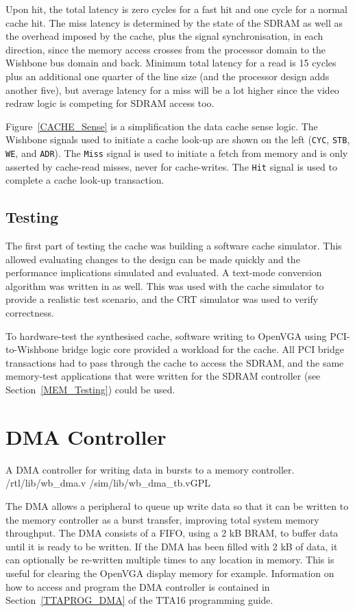 Upon hit, the total latency is zero cycles for a fast hit and one cycle for a
normal cache hit. The miss latency is determined by the state of the SDRAM as
well as the overhead imposed by the cache, plus the signal synchronisation, in
each direction, since the memory access crosses from the processor domain
to the Wishbone bus domain and back. Minimum total latency for a read is 15
cycles plus an additional one quarter of the line size (and the processor
design adds another five), but average latency for a miss will be a lot higher
since the video redraw logic is competing for SDRAM access too.

Figure~\ref{CACHE_Sense} is a simplification the data cache sense logic. The
Wishbone signals used to initiate a cache look-up are shown on the left
(\texttt{CYC}, \texttt{STB}, \texttt{WE}, and \texttt{ADR}). The \texttt{Miss}
signal is used to initiate a fetch from memory and is only asserted by cache-read
misses, never for cache-writes. The \texttt{Hit} signal is used to complete a
cache look-up transaction.


\subsection{Testing}
The first part of testing the cache was building a software cache simulator. This
allowed evaluating changes to the design can be made quickly and the performance
implications simulated and evaluated. A text-mode conversion algorithm was
written in as well. This was used with the cache simulator to provide a realistic
test scenario, and the CRT simulator was used to verify correctness.

To hardware-test the synthesised cache, software writing to OpenVGA using
PCI-to-Wishbone bridge logic core provided a workload for the cache. All PCI
bridge transactions had to pass through the cache to access the SDRAM, and the
same memory-test applications that were written for the SDRAM controller (see
Section~\ref{MEM_Testing}) could be used.



\section{DMA Controller}
\label{MEM_DMA}

{A DMA controller for writing data in bursts to a memory controller.}
{/rtl/lib/wb\_dma.v} {/sim/lib/wb\_dma\_tb.v}{GPL}

The DMA allows a peripheral to queue up write data so that it can be written to
the memory controller as a burst transfer, improving total system memory
throughput. The DMA consists of a FIFO, using a 2 kB BRAM, to buffer data until
it is ready to be written. If the DMA has been filled with 2 kB of data, it can
optionally be re-written multiple times to any location in memory. This is useful
for clearing the OpenVGA display memory for example. Information on how to access
and program the DMA controller is contained in Section~\ref{TTAPROG_DMA} of the
TTA16 programming guide.


